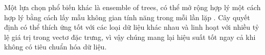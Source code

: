 Một lựa chọn phổ biến khác là ensemble of trees, có thể mở rộng hợp lý một cách hợp lý bằng cách lấy mẫu không gian tính năng trong mỗi lần lặp \cite{breiman2001random}.
Cây quyết định có thể thích ứng tốt với các loại dữ liệu khác nhau và linh hoạt với nhiều tỷ lệ giá trị trong vectơ đặc trưng, vì vậy chúng mang lại hiệu suất tốt ngay cả khi không có tiêu chuẩn hóa dữ liệu.
